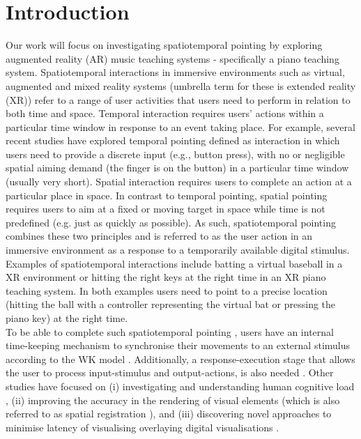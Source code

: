 \documentclass[manuscript,screen]{acmart}
\begin{document}
\section{Introduction}

Our work will focus on investigating spatiotemporal pointing by exploring augmented reality (AR) music teaching systems - specifically a piano teaching system. Spatiotemporal interactions in immersive environments such as virtual, augmented and mixed reality systems (umbrella term for these is extended reality (XR)) refer to a range of user activities that users need to perform in relation to both time and space. Temporal interaction requires users’ actions within a particular time window in response to an event taking place. For example, several recent studies have explored temporal pointing \cite{lee2016modelling} defined as interaction in which users need to provide a discrete input (e.g., button press), with no or negligible spatial aiming demand (the finger is on the button) in a particular time window (usually very short). Spatial interaction requires users to complete an action at a particular place in space. In contrast to temporal pointing, spatial pointing requires users to aim at a fixed or moving target in space while time is not predefined (e.g. just as quickly as possible). As such, spatiotemporal pointing combines these two principles and is referred to as the user action in an immersive environment as a response to a temporarily available digital stimulus. Examples of spatiotemporal interactions include batting a virtual baseball in a XR environment or hitting the right keys at the right time in an XR piano teaching system. In both examples users need to point to a precise location (hitting the ball with a controller representing the virtual bat or pressing the piano key) at the right time. \\

To be able to complete such spatiotemporal pointing \cite{lee2016modelling}, users have an internal time-keeping mechanism to synchronise their movements to an external stimulus according to the WK model \cite{wing1973response}. Additionally, a response-execution stage that allows the user to process input-stimulus and output-actions, is also needed \cite{wing1973timing}. Other studies have focused on (i) investigating and understanding human cognitive load \cite{radu2009augmented}, (ii) improving the accuracy in the rendering of visual elements (which is also referred to as spatial registration \cite{zheng2013general}), and (iii) discovering novel approaches to minimise latency of visualising overlaying digital visualisations \cite{serafin2017considerations}. \\
\end{document}
